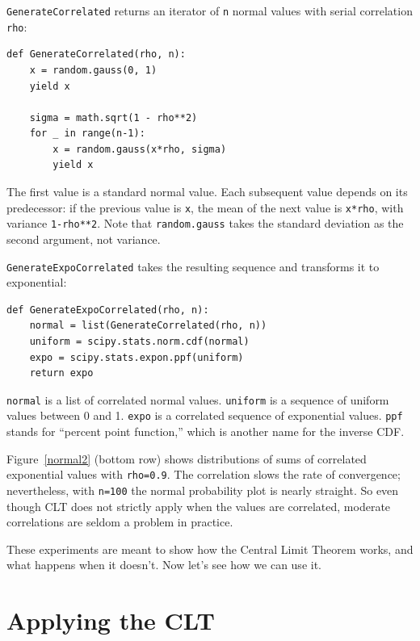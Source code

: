 \documentclass[12pt]{book}
\begin{document}
\verb"GenerateCorrelated" returns an iterator of \verb"n" normal values
with serial correlation \verb"rho":

\begin{verbatim}
def GenerateCorrelated(rho, n):
    x = random.gauss(0, 1)
    yield x

    sigma = math.sqrt(1 - rho**2)
    for _ in range(n-1):
        x = random.gauss(x*rho, sigma)
        yield x
\end{verbatim}

The first value is a standard normal value.  Each subsequent value
depends on its predecessor: if the previous value is \verb"x", the mean of
the next value is \verb"x*rho", with variance \verb"1-rho**2".  Note that
\verb"random.gauss" takes the standard deviation as the second argument,
not variance.

\verb"GenerateExpoCorrelated"
takes the resulting sequence and transforms it to exponential:

\begin{verbatim}
def GenerateExpoCorrelated(rho, n):
    normal = list(GenerateCorrelated(rho, n))
    uniform = scipy.stats.norm.cdf(normal)
    expo = scipy.stats.expon.ppf(uniform)
    return expo
\end{verbatim}

\verb"normal" is a list of correlated normal values.  \verb"uniform"
is a sequence of uniform values between 0 and 1.  \verb"expo" is
a correlated sequence of exponential values.
\verb"ppf" stands for ``percent point function,'' which is another
name for the inverse CDF.

Figure~\ref{normal2} (bottom row) shows distributions of sums of
correlated exponential values with \verb"rho=0.9".  The correlation
slows the rate of convergence; nevertheless, with \verb"n=100" the
normal probability plot is nearly straight.  So even though CLT
does not strictly apply when the values are correlated, moderate
correlations are seldom a problem in practice.

These experiments are meant to show how the Central Limit Theorem
works, and what happens when it doesn't.  Now let's see how we can
use it.


\section{Applying the CLT}
\label{usingCLT}
\end{document}
